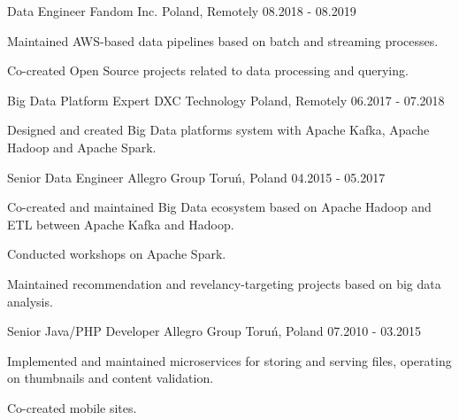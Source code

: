 \begin{cventries}
  \cventry
    {Data Engineer} %
    {Fandom Inc.} %
    {Poland, Remotely} %
    {08.2018 - 08.2019} %
    {
      \begin{cvitems} %
        \item {Maintained AWS-based data pipelines based on batch and streaming processes.}
        \item {Co-created Open Source projects related to data processing and querying.}
      \end{cvitems}
    }

  \cventry
    {Big Data Platform Expert} %
    {DXC Technology} %
    {Poland, Remotely} %
    {06.2017 - 07.2018} %
    {
      \begin{cvitems} %
        \item {Designed and created Big Data platforms system with Apache Kafka, Apache Hadoop and Apache Spark.}
      \end{cvitems}
    }

  \cventry
    {Senior Data Engineer} %
    {Allegro Group} %
    {Toruń, Poland} %
    {04.2015 - 05.2017} %
    {
      \begin{cvitems} %
        \item {Co-created and maintained Big Data ecosystem based on Apache Hadoop and ETL between Apache Kafka and Hadoop.}
        \item {Conducted workshops on Apache Spark.}
        \item {Maintained recommendation and revelancy-targeting projects based on big data analysis.}
      \end{cvitems}
    }

  \cventry
    {Senior Java/PHP Developer} %
    {Allegro Group} %
    {Toruń, Poland} %
    {07.2010 - 03.2015} %
    {
      \begin{cvitems} %
        \item {Implemented and maintained microservices for storing and serving files, operating on thumbnails and content validation.}
        \item {Co-created mobile sites.}
      \end{cvitems}
    }

\end{cventries}

